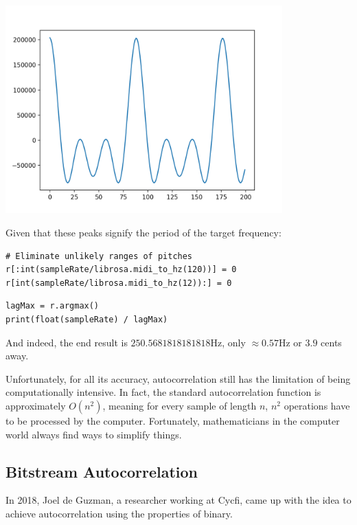 \documentclass{article}
\begin{document}
\begin{center} \includegraphics[width=0.8\textwidth]{img/ac_figure.png} \end{center}

Given that these peaks signify the period of the target frequency:

\begin{verbatim}
# Eliminate unlikely ranges of pitches
r[:int(sampleRate/librosa.midi_to_hz(120))] = 0
r[int(sampleRate/librosa.midi_to_hz(12)):] = 0
\end{verbatim}

\begin{verbatim}
lagMax = r.argmax()
print(float(sampleRate) / lagMax)
\end{verbatim}

And indeed, the end result is $250.5681818181818$Hz, only $\approx 0.57$Hz or $3.9$ cents away.

Unfortunately, for all its accuracy, autocorrelation still has the limitation of being computationally intensive. In fact, the standard autocorrelation function is approximately $O(n^2)$, meaning for every sample of length $n$, $n^2$ operations have to be processed by the computer. Fortunately, mathematicians in the computer world always find ways to simplify things.

\subsection{Bitstream Autocorrelation}

In 2018, Joel de Guzman, a researcher working at Cycfi, came up with the idea to achieve autocorrelation using the properties of binary\cite{Guzman2018FastAutocorrelation}. 
\end{document}
